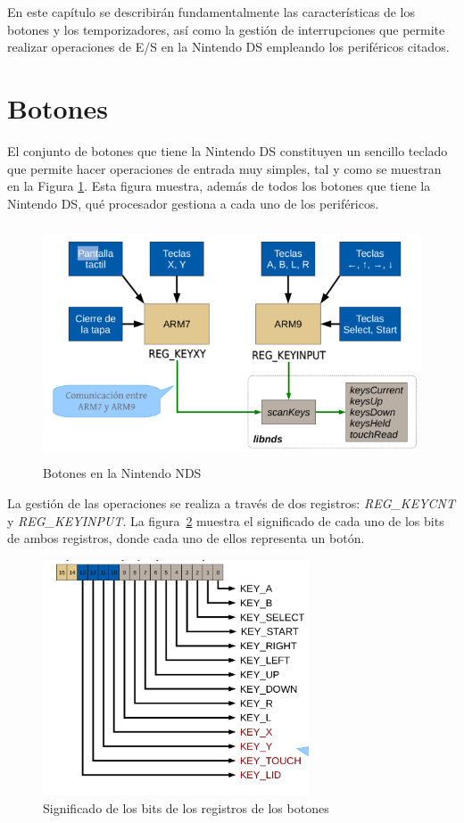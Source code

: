 En este capítulo se describirán fundamentalmente las características de los botones y los 
temporizadores, así como la gestión de interrupciones que permite realizar operaciones de E/S en la Nintendo DS empleando los periféricos citados. 

\section{Botones}
El conjunto de botones que tiene la Nintendo DS constituyen un sencillo teclado que permite hacer operaciones de entrada muy simples, tal y como se muestran en la Figura \ref{fig:c9_botones-teclado}. Esta figura muestra, además de todos los  botones que tiene la Nintendo DS, qué procesador gestiona a cada uno de los  periféricos. 

\begin{figure}[h]
	\centering
	\includegraphics[height=7cm]{./Figuras/C9/c9_botones_teclado.PNG}
	\caption{Botones en la Nintendo NDS}
	\label{fig:c9_botones-teclado}
\end{figure}

La gestión de las operaciones se realiza a través de dos registros: \textit{REG\_KEYCNT} y \textit{REG\_KEYINPUT}. La figura~\ref{fig_p2_c2_registros-teclado} muestra el significado de cada uno de los  bits de ambos registros, donde cada uno de ellos representa un botón.

\begin{figure}[h]
	\centering
	\includegraphics[height=7cm]{./Figuras/C9/c9_registros-teclado.PNG}
	\caption{Significado de los bits de los registros de los botones}
	\label{fig_p2_c2_registros-teclado}
\end{figure}


